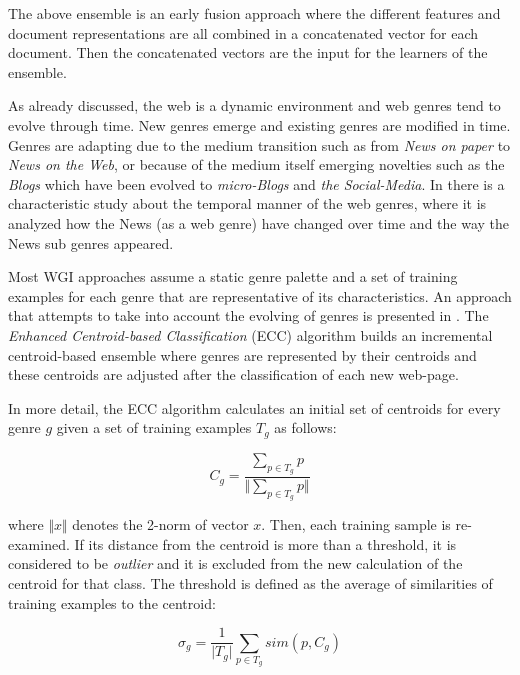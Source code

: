 \begin{itemize}
\begin{end}
The above ensemble is an early fusion approach where the different features and document representations are all combined in a concatenated vector for each document. Then the concatenated vectors are the input for the learners of the ensemble.

As already discussed, the web is a dynamic environment and web genres tend to evolve through time. New genres  emerge and existing genres are modified in time. Genres are adapting due to the medium transition such as from \textit{News on paper} to \textit{News on the Web}, or because of the medium itself emerging novelties such as the \textit{Blogs} which have been evolved to \textit{micro-Blogs} and \textit{the Social-Media}. In \parencite{caple2017genre} there is a characteristic study about the temporal manner of the web genres, where it is analyzed how the News (as a web genre) have changed over time and the way the News sub genres appeared.

Most WGI approaches assume a static genre palette and a set of training examples for each genre that are representative of its characteristics. An approach that attempts to take into account the evolving of genres is presented in . The \textit{Enhanced Centroid-based Classification} (ECC) algorithm builds an incremental centroid-based ensemble where genres are represented by their centroids and these centroids are adjusted after the classification of each new web-page.

In more detail, the ECC algorithm calculates an initial set of centroids for every genre $g$ given a set of training examples $T_g$ as follows:

\begin{equation}\label{eq:jebary_ecc_centroids}
	C_{g} = \frac{\sum_{p \in T_{g}} p}{\Vert \sum_{p \in T_{g}} p\Vert}
\end{equation}

\nointend where $\Vert x \Vert$ denotes the 2-norm of vector $x$. Then, each training sample is re-examined. If its distance from the centroid is more than a threshold, it is considered to be \textit{outlier} and it is excluded from the new calculation of the centroid for that class. The threshold is defined as the average of similarities of training examples to the centroid:

\begin{equation}\label{eq:jebary_ecc_theshold}
	\sigma_{g} = \frac{1}{\vert T_{g} \vert } \sum_{p \in T_{g}} sim(p, C_{g})
\end{equation}


\end{end}
\end{itemize}
